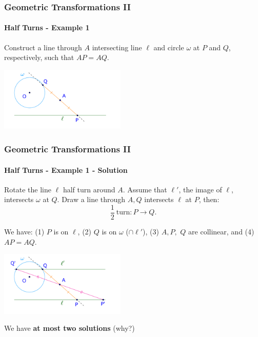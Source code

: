 \documentclass[8pt,xcolor=table,dvipsnames]{beamer}
\begin{document}
\begin{frame}[t]
    \frametitle{Geometric Transformations II}
    \framesubtitle{Half Turns - Example 1}
    \begin{example}
        Construct a line through $A$ intersecting line $\ell$ and circle $\omega$ at $P$ and $Q$, respectively,
        such that $AP = AQ.$
    \end{example}
    \bigbreak
    \begin{center}
        \includegraphics[width=6cm]{./svg/pdf/rotation-p8a.pdf}
    \end{center}
\end{frame}

\begin{frame}[t]
    \frametitle{Geometric Transformations II}
    \framesubtitle{Half Turns - Example 1 - Solution}
    Rotate the line $\ell$ half turn around $A$.
    Assume that $\ell'$, the image of $\ell$, intersects $\omega$ at $Q$.
    Draw a line through $A, Q$ intersects $\ell$ at $P$, then:
    \[
        \frac{1}{2}\ \text{turn}: P \rightarrow Q.
    \]

    \bigbreak
    We have: (1) $P$ is on $\ell$, (2) $Q$ is on $\omega$ ($\cap \ell'$), (3) $A, P,$ $Q$ are collinear, and 
    (4) $AP = AQ$.

    \begin{center}
        \includegraphics[width=6cm]{./svg/pdf/rotation-p8b.pdf}
    \end{center}

    We have \textbf{at most two solutions} (why?)
\end{frame}
\end{document}
